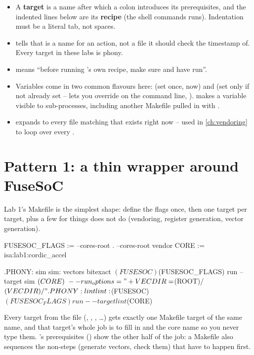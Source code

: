\begin{itemize}
  \item A \textbf{target} is a name after which a colon introduces its
        prerequisites, and the indented lines below are its
        \textbf{recipe} (the shell commands  runs). Indentation
        must be a literal tab, not spaces.
  \item {} tells  that  is a name for
        an action, not a file it should check the timestamp of. Every
        target in these labs is phony.
  \item {} means ``before running 's own
        recipe, make sure  and  have run''.
  \item Variables come in two common flavours here: \code{:=} (set once,
        now) and  (set only if not already set -- lets you
        override on the command line, ).
         makes a variable visible to sub-processes, including
        another Makefile pulled in with .
  \item {} expands to every file matching
         that exists right now -- used in
        \cref{ch:vendoring} to loop over every .
\end{itemize}

\section{Pattern 1: a thin wrapper around FuseSoC}

Lab 1's Makefile is the simplest shape: define the flags once, then one
target per \FuseSoC target, plus a few for things \FuseSoC does not do
(vendoring, register generation, vector generation).

\begin{makecode}[caption={lab1/Makefile -- the shape, trimmed}]
FUSESOC_FLAGS := --cores-root . --cores-root vendor
CORE          := isa:lab1:cordic_accel

.PHONY: sim
sim: vectors bitexact
	$(FUSESOC) $(FUSESOC_FLAGS) run --target sim $(CORE) \
	  --run_options="+VECDIR=$(ROOT)/$(VECDIR)/"

.PHONY: lint
lint:
	$(FUSESOC) $(FUSESOC_FLAGS) run --target lint $(CORE)
\end{makecode}

Every \FuseSoC target from the  file (, ,
\code{synth}, \dots) gets exactly one Makefile target of the same name, and
that target's whole job is to fill in \code{--cores-root} and the core name
so you never type them. \code{sim}'s prerequisites (\code{vectors
bitexact}) show the other half of the job: a Makefile also sequences the
non-\FuseSoC steps (generate vectors, check them) that have to happen
first.

